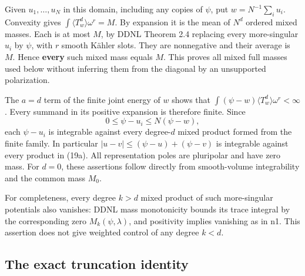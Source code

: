 \documentclass[
  11pt,
]{article}
\begin{document}
Given \(u_1,\ldots,u_N\) in this domain, including any copies of
\(\psi\), put \(w=N^{-1}\sum_i u_i\). Convexity gives
\(\int\langle T_w^d\rangle\omega^r=M\). By expansion it is the mean of
\(N^d\) ordered mixed masses. Each is at most \(M\), by DDNL Theorem 2.4
replacing every more-singular \(u_i\) by \(\psi\), with \(r\) smooth
Kähler slots. They are nonnegative and their average is \(M\). Hence
\textbf{every} such mixed mass equals \(M\). This proves all mixed full
masses used below without inferring them from the diagonal by an
unsupported polarization.

The \(a=d\) term of the finite joint energy of \(w\) shows that
\(\int(\psi-w)\langle T_w^d\rangle\omega^r<\infty\). Every summand in
its positive expansion is therefore finite. Since \[
0\leq\psi-u_i\leq N(\psi-w),
\] each \(\psi-u_i\) is integrable against every degree-\(d\) mixed
product formed from the finite family. In particular
\(|u-v|\leq(\psi-u)+(\psi-v)\) is integrable against every product in
(19a). All representation poles are pluripolar and have zero mass. For
\(d=0\), these assertions follow directly from smooth-volume
integrability and the common mass \(M_0\).

For completeness, every degree \(k>d\) mixed product of such
more-singular potentials also vanishes: DDNL mass monotonicity bounds
its trace integral by the corresponding zero \(M_k(\psi,\lambda)\), and
positivity implies vanishing as in n1. This assertion does not give
weighted control of any degree \(k<d\).

\subsection{The exact truncation
identity}\label{the-exact-truncation-identity}
\end{document}
